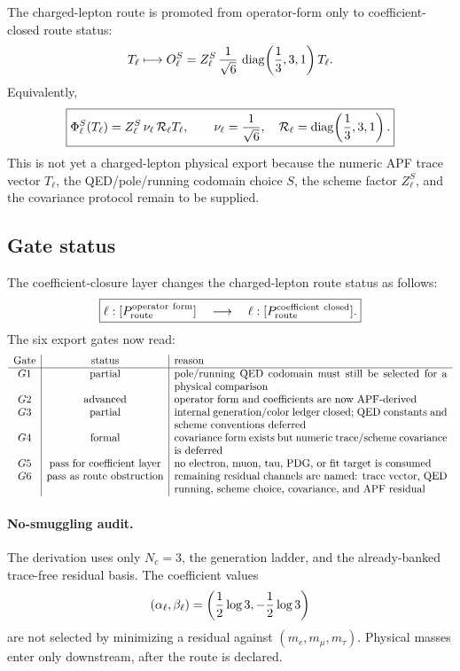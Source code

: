 \begin{corollary}
The charged-lepton route is promoted from operator-form only to
coefficient-closed route status:
\[
        T_\ell
        \longmapsto
        O_\ell^S
        =Z_\ell^S\,{1\over\sqrt6}\,
        \operatorname{diag}\!\left({1\over3},3,1\right)T_\ell.
\]
Equivalently,
\[
        \boxed{
        \Phi_\ell^S(T_\ell)
        = Z_\ell^S\,\nu_\ell\,\mathcal R_\ell T_\ell,
        \qquad
        \nu_\ell={1\over\sqrt6},
        \quad
        \mathcal R_\ell=\operatorname{diag}\!\left({1\over3},3,1\right).
        }
\]
This is not yet a charged-lepton physical export because the numeric APF trace
vector $T_\ell$, the QED/pole/running codomain choice $S$, the scheme factor
$Z_\ell^S$, and the covariance protocol remain to be supplied.
\end{corollary}

\subsection{Gate status}

The coefficient-closure layer changes the charged-lepton route status as
follows:
\[
        \boxed{
        \ell:[P_{\rm route}^{\rm operator\ form}]
        \quad\longrightarrow\quad
        \ell:[P_{\rm route}^{\rm coefficient\ closed}].
        }
\]
The six export gates now read:
\[
\begin{array}{c|c|p{9cm}}
\text{Gate} & \text{status} & \text{reason}\\ \hline
G1 & \text{partial} & pole/running QED codomain must still be selected for a physical comparison\\
G2 & \text{advanced} & operator form and coefficients are now APF-derived\\
G3 & \text{partial} & internal generation/color ledger closed; QED constants and scheme conventions deferred\\
G4 & \text{formal} & covariance form exists but numeric trace/scheme covariance is deferred\\
G5 & \text{pass for coefficient layer} & no electron, muon, tau, PDG, or fit target is consumed\\
G6 & \text{pass as route obstruction} & remaining residual channels are named: trace vector, QED running, scheme choice, covariance, and APF residual\\
\end{array}
\]

\paragraph{No-smuggling audit.}
The derivation uses only $N_c=3$, the generation ladder, and the already-banked
trace-free residual basis.  The coefficient values
\[
        (\alpha_\ell,\beta_\ell)
        =\left({1\over2}\log3,-{1\over2}\log3\right)
\]
are not selected by minimizing a residual against $(m_e,m_\mu,m_\tau)$.  Physical
masses enter only downstream, after the route is declared.

